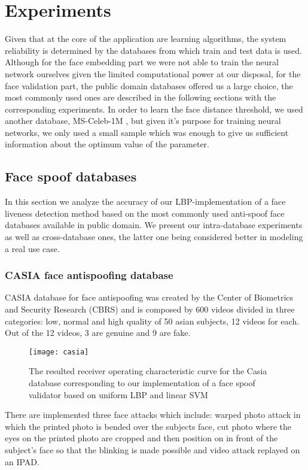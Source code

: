 \chapter{Experiments}
Given that at the core of the application are learning algorithms, the system reliability is determined by the databases from which train and test data is used. Although for the face embedding part we were not able to train the neural network ourselves given the limited computational power at our disposal, for the face validation part, the public domain databases offered us a large choice, the most commonly used ones are described in the following sections with the corresponding experiments. In order to learn the face distance threshold, we used another database, MS-Celeb-1M \cite{guo2016msceleb}, but given it's purpose for training neural networks, we only used a small sample which was enough to give us sufficient information about the optimum value of the parameter.
\section{Face spoof databases}
In this section we analyze the accuracy of our LBP-implementation of a face liveness detection method based on the most commonly used anti-spoof face databases available in public domain. We present our intra-database experiments as well as cross-database ones, the latter one being considered better in modeling a real use case.
\subsection{CASIA face antispoofing database }
CASIA database for face antispoofing was created by the Center of Biometrics and Security Research (CBRS) and is composed by 600 videos divided in three categories: low, normal and high quality of 50 asian subjects, 12 videos for each. Out of the 12 videos, 3 are genuine and 9 are fake.
\begin{wrapfigure}{r}{10cm}
	\captionsetup{width=10cm,font=small}
	\texttt{[image: casia]}
	\caption[CASIA database reported ROC curve]{The resulted receiver operating characteristic curve for the Casia database corresponding to our implementation of a face spoof validator based on uniform LBP and linear SVM}
	\label{fig:casia_roc}
\end{wrapfigure}

There are implemented three face attacks which include: warped photo attack in which the printed photo is bended over the subjects face, cut photo where the eyes on the printed photo are cropped and then position on in front of the subject's face so that the blinking is made possible and video attack replayed on an IPAD.


